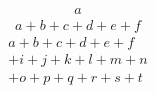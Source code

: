 \documentclass{article}
\begin{document}
\begin{multline}
a
\end{multline}
\begin{multline}
a+b+c+d+e+f
\end{multline}
\begin{multline}
a+b+c+d+e+f\\
+i+j+k+l+m+n\\
+o+p+q+r+s+t
\end{multline}
\end{document}
